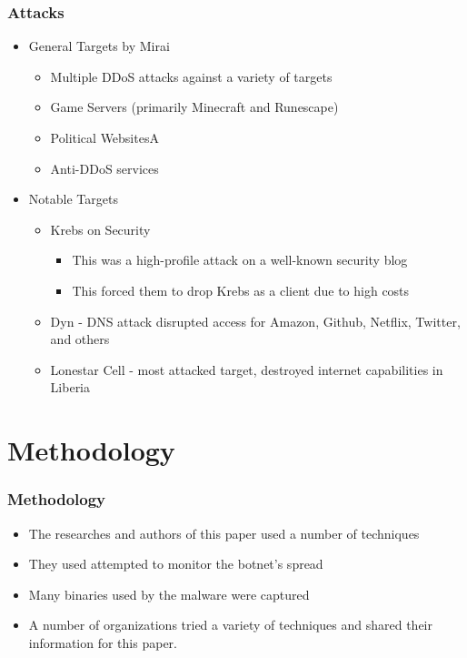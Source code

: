 \documentclass{beamer}
\begin{document}
\begin{frame}
    \frametitle{Attacks}
	\begin{itemize}
		\item General Targets by Mirai
			\begin{itemize}
				\item Multiple DDoS attacks against a variety of targets
				\item Game Servers (primarily Minecraft and Runescape)
				\item Political WebsitesA
				\item Anti-DDoS services
			\end{itemize}
		\item Notable Targets
			\begin{itemize}
				\item Krebs on Security
				\begin{itemize}
					\item This was a high-profile attack on a well-known security blog
					\item This forced them to drop Krebs as a client due to high costs
				\end{itemize}
				\item Dyn - DNS attack disrupted access for Amazon, Github, Netflix, Twitter, and others
				\item Lonestar Cell - most attacked target, destroyed internet capabilities in Liberia
			\end{itemize}
	\end{itemize}
\end{frame}

\section{Methodology}

\begin{frame}
	\frametitle{Methodology}
	\begin{itemize}
		\item The researches and authors of this paper used a number of techniques
		\item They used attempted to monitor the botnet's spread
		\item Many binaries used by the malware were captured
		\item A number of organizations tried a variety of techniques and shared their information for this paper.
	\end{itemize}
\end{frame}
\end{document}

